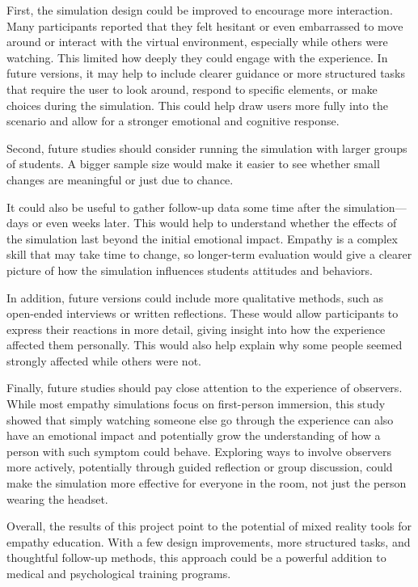 First, the simulation design could be improved to encourage more interaction. Many participants reported that they felt hesitant or even embarrassed to move around or interact with the virtual environment, especially while others were watching. This limited how deeply they could engage with the experience. In future versions, it may help to include clearer guidance or more structured tasks that require the user to look around, respond to specific elements, or make choices during the simulation. This could help draw users more fully into the scenario and allow for a stronger emotional and cognitive response.

\vspace{1em}

Second, future studies should consider running the simulation with larger groups of students. A bigger sample size would make it easier to see whether small changes are meaningful or just due to chance. 

It could also be useful to gather follow-up data some time after the simulation—days or even weeks later. This would help to understand whether the effects of the simulation last beyond the initial emotional impact. Empathy is a complex skill that may take time to change, so longer-term evaluation would give a clearer picture of how the simulation influences students attitudes and behaviors.

\vspace{1em}

In addition, future versions could include more qualitative methods, such as open-ended interviews or written reflections. These would allow participants to express their reactions in more detail, giving insight into how the experience affected them personally. This would also help explain why some people seemed strongly affected while others were not.

Finally, future studies should pay close attention to the experience of observers. While most empathy simulations focus on first-person immersion, this study showed that simply watching someone else go through the experience can also have an emotional impact and potentially grow the understanding of how a person with such symptom could behave. Exploring ways to involve observers more actively, potentially through guided reflection or group discussion, could make the simulation more effective for everyone in the room, not just the person wearing the headset.

\vspace{1em}

Overall, the results of this project point to the potential of mixed reality tools for empathy education. With a few design improvements, more structured tasks, and thoughtful follow-up methods, this approach could be a powerful addition to medical and psychological training programs.